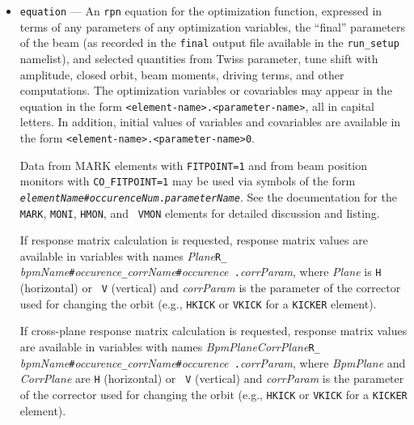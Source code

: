 \documentclass[11pt]{article}
\begin{document}
\begin{itemize}
\item \verb|equation| --- An {\tt rpn} equation for the optimization
function, expressed in terms of any parameters of any optimization
variables, the ``final'' parameters of the beam (as recorded in the
\verb|final| output file available in the \verb|run_setup| namelist),
and selected quantities from Twiss parameter, tune shift with amplitude,
closed orbit, beam moments, driving terms, and other computations.
The optimization variables or covariables may appear in the equation
in the form \verb|<element-name>.<parameter-name>|, all in capital
letters.  In addition, initial values of variables and covariables
are available in the form \verb|<element-name>.<parameter-name>0|.

Data from MARK elements with {\tt FITPOINT=1} and from beam position
monitors with {\tt CO\_FITPOINT=1} may be used via symbols of the form
{\tt {\em elementName}\#{\em occurenceNum}.{\em parameterName}}.  See the
documentation for the {\tt MARK}, {\tt MONI}, {\tt HMON}, and {\tt
VMON} elements for detailed discussion and listing.

If response matrix calculation is requested, response matrix values
are available in variables with names {\em Plane}{\tt R\_}{\em
bpmName}\verb|#|{\em occurence}{\tt \_}{\em corrName}\verb|#|{\em occurence}{\tt
.}{\em corrParam}, where {\em Plane} is {\tt H} (horizontal) or {\tt
V} (vertical) and {\em corrParam} is the parameter of the corrector
used for changing the orbit (e.g., {\tt HKICK} or {\tt VKICK} for a
{\tt KICKER} element).

If cross-plane response matrix calculation is requested, response matrix values
are available in variables with names {\em BpmPlane}{\em CorrPlane}{\tt R\_}{\em
bpmName}\verb|#|{\em occurence}{\tt \_}{\em corrName}\verb|#|{\em occurence}{\tt
.}{\em corrParam}, where {\em BpmPlane} and {\em CorrPlane} are  {\tt H} (horizontal) or {\tt
V} (vertical) and {\em corrParam} is the parameter of the corrector
used for changing the orbit (e.g., {\tt HKICK} or {\tt VKICK} for a
{\tt KICKER} element).


\end{itemize}
\end{document}
